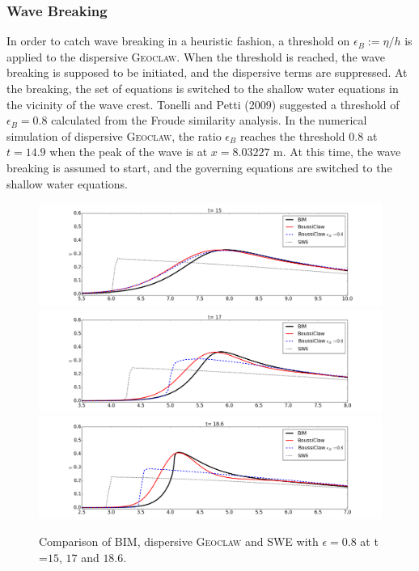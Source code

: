 \documentclass[review]{elsarticle}
\begin{document}
\subsubsection{Wave Breaking}

In order to catch wave breaking in a heuristic fashion,
a threshold on $\epsilon_B:=\eta/h$ is applied to the dispersive \textsc{Geoclaw}.
When the threshold is reached, 
the wave breaking is supposed to be initiated, 
and the dispersive terms are suppressed.
At the breaking, the set of equations is
switched to the shallow water equations
in the vicinity of the wave crest.
Tonelli and Petti (2009) \citep{tonelli2009hybrid} suggested
a threshold of $\epsilon_B=0.8$ 
calculated from the Froude similarity analysis.
In the numerical simulation of dispersive \textsc{Geoclaw},
the ratio $\epsilon_B$ reaches the threshold $0.8$ at $t=14.9$
when the peak of the wave is at $x=8.03227$ m.
At this time, the wave breaking is assumed to start, 
and the governing equations are switched 
to the shallow water equations.

\begin{figure}[!htb]
\centering
\includegraphics[width=.9\textwidth]{_fig/bim_dgeo_etaB8_150.png}\\
\includegraphics[width=.9\textwidth]{_fig/bim_dgeo_etaB8_170.png}\\
\includegraphics[width=.9\textwidth]{_fig/bim_dgeo_etaB8_186.png}
\caption{Comparison of BIM, dispersive \textsc{Geoclaw} and SWE 
with $\epsilon=0.8$ at t =$15$, $17$ and $18.6$.}
\label{fig:dgeo_th08}
\end{figure}
\end{document}
